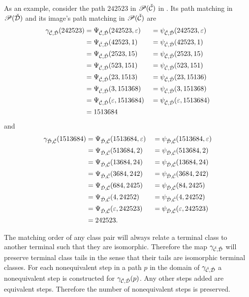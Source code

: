 As an example, consider the path $242523$ in $\mathscr{P}(\check{\mathcal{C}})$ in . Its path matching in $\mathscr{P}(\check{\mathcal{D}})$ and its image's path matching in $\mathscr{P}(\check{\mathcal{C}})$ are
\begin{alignat*}{3}
    \gamma_{\check{\mathcal{C}},\check{\mathcal{D}}}(242523) &= \Psi_{\check{\mathcal{C}},\check{\mathcal{D}}}(242523, \varepsilon) &&= \psi_{\check{\mathcal{C}},\check{\mathcal{D}}}(242523, \varepsilon)\\
    &= \Psi_{\check{\mathcal{C}},\check{\mathcal{D}}}(42523,1) &&= \psi_{\check{\mathcal{C}},\check{\mathcal{D}}}(42523,1)\\
    &= \Psi_{\check{\mathcal{C}},\check{\mathcal{D}}}(2523,15) &&= \psi_{\check{\mathcal{C}},\check{\mathcal{D}}}(2523,15)\\
    &= \Psi_{\check{\mathcal{C}},\check{\mathcal{D}}}(523,151) &&= \psi_{\check{\mathcal{C}},\check{\mathcal{D}}}(523,151)\\
    &= \Psi_{\check{\mathcal{C}},\check{\mathcal{D}}}(23,1513) &&= \psi_{\check{\mathcal{C}},\check{\mathcal{D}}}(23,15136)\\
    &= \Psi_{\check{\mathcal{C}},\check{\mathcal{D}}}(3,151368) &&= \psi_{\check{\mathcal{C}},\check{\mathcal{D}}}(3,151368)\\
    &= \Psi_{\check{\mathcal{C}},\check{\mathcal{D}}}(\varepsilon,1513684) &&= \psi_{\check{\mathcal{C}},\check{\mathcal{D}}}(\varepsilon,1513684)\\
    &= 1513684
\end{alignat*}
and
\begin{alignat*}{3}
    \gamma_{\check{\mathcal{D}},\check{\mathcal{C}}}(1513684) &= \Psi_{\check{\mathcal{D}},\check{\mathcal{C}}}(1513684, \varepsilon) &&= \psi_{\check{\mathcal{D}},\check{\mathcal{C}}}(1513684, \varepsilon)\\
    &= \Psi_{\check{\mathcal{D}},\check{\mathcal{C}}}(513684, 2) &&= \psi_{\check{\mathcal{D}},\check{\mathcal{C}}}(513684, 2)\\
    &= \Psi_{\check{\mathcal{D}},\check{\mathcal{C}}}(13684, 24) &&= \psi_{\check{\mathcal{D}},\check{\mathcal{C}}}(13684, 24)\\
    &= \Psi_{\check{\mathcal{D}},\check{\mathcal{C}}}(3684, 242) &&= \psi_{\check{\mathcal{D}},\check{\mathcal{C}}}(3684, 242)\\
    &= \Psi_{\check{\mathcal{D}},\check{\mathcal{C}}}(684, 2425) &&= \psi_{\check{\mathcal{D}},\check{\mathcal{C}}}(84, 2425)\\
    &= \Psi_{\check{\mathcal{D}},\check{\mathcal{C}}}(4, 24252) &&= \psi_{\check{\mathcal{D}},\check{\mathcal{C}}}(4, 24252)\\
    &= \Psi_{\check{\mathcal{D}},\check{\mathcal{C}}}(\varepsilon, 242523) &&= \psi_{\check{\mathcal{D}},\check{\mathcal{C}}}(\varepsilon, 242523)\\
    &= 242523.
\end{alignat*}

The matching order of any class pair will always relate a terminal class to another terminal such that they are isomorphic. Therefore the map $\gamma_{\check{\mathcal{C}},\check{\mathcal{D}}}$ will preserve terminal class tails in the sense that their tails are isomorphic terminal classes. For each nonequivalent step in a path $p$ in the domain of $\gamma_{\check{\mathcal{C}},\check{\mathcal{D}}}$ a nonequivalent step is constructed for $\gamma_{\check{\mathcal{C}},\check{\mathcal{D}}}(p)$. Any other steps added are equivalent steps. Therefore the number of nonequivalent steps is preserved.

